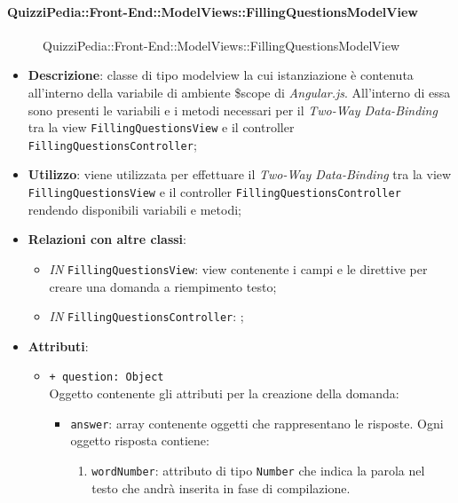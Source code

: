 \paragraph{QuizziPedia::Front-End::ModelViews::FillingQuestionsModelView}
\begin{figure} [ht]
	\centering
	\caption{QuizziPedia::Front-End::ModelViews::FillingQuestionsModelView}
\end{figure} \FloatBarrier
\begin{itemize}
	\item \textbf{Descrizione}: classe di tipo modelview la cui istanziazione è contenuta all'interno della variabile di ambiente \$scope di \textit{Angular.js}. All'interno di essa sono presenti le variabili e i metodi necessari per il \textit{Two-Way Data-Binding} tra la view \texttt{FillingQuestionsView} e il controller \texttt{FillingQuestionsController}; 
	\item \textbf{Utilizzo}: viene utilizzata per effettuare il \textit{Two-Way Data-Binding} tra la view \texttt{FillingQuestionsView} e il controller \texttt{FillingQuestionsController} rendendo disponibili variabili e metodi;
	\item \textbf{Relazioni con altre classi}:
	\begin{itemize}
		\item \textit{IN} \texttt{FillingQuestionsView}: view contenente i campi e le direttive per creare una domanda a riempimento testo; 
		\item \textit{IN} \texttt{FillingQuestionsController}: ;
	\end{itemize}
	\item \textbf{Attributi}:
	\begin{itemize}
		\item \texttt{+ question: Object} \\ Oggetto contenente gli attributi per la creazione della domanda:
		\begin{itemize}
			\item \texttt{answer}: array contenente oggetti che rappresentano le risposte. Ogni oggetto risposta contiene:
			\begin{enumerate}
				\item \texttt{wordNumber}: attributo di tipo \texttt{Number} che indica la parola nel testo che andrà inserita in fase di compilazione.
			\end{enumerate}
		\end{itemize}

\end{itemize}
\end{itemize}
